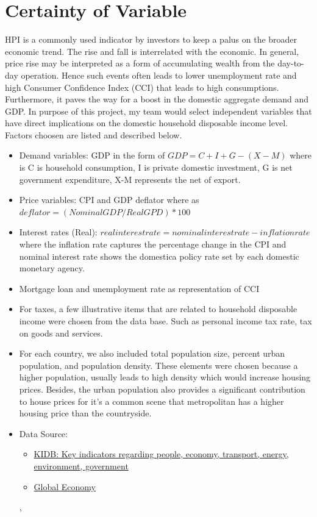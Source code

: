 \documentclass[11pt]{article}
\begin{document}
\section{Certainty of Variable}\label{section-Certainty}
HPI is a commonly used indicator by investors to keep a palus on the broader economic trend. The rise and fall is interrelated with the economic. In general, price rise may be interpreted as a form of accumulating wealth from the day-to-day operation. Hence such events often leads to lower unemployment rate and high Consumer Confidence Index (CCI) that leads to high consumptions. Furthermore, it paves the way for a boost in the domestic aggregate demand and GDP\citep{aei297454}. In purpose of this project, my team would select independent variables that have direct implications on the domestic household disposable income level. Factors choosen are listed and described below. 
\begin{itemize}
\item Demand variables: GDP in the form of \(GDP = C + I + G - (X-M)\) where is C is household consumption, I is private domestic investment, G is net government expenditure, X-M represents the net of export. 
\item Price variables: CPI and GDP deflator where as \(deflator = (Nominal GDP / Real GPD) * 100 \)
\item Interest rates (Real): \(real interest rate = nominal interest rate - inflation rate\) where the inflation rate captures the percentage change in the CPI and nominal interest rate shows the domestica policy rate set by each domestic monetary agency. 
\item Mortgage loan and unemployment rate as representation of CCI
\item For taxes, a few illustrative items that are related to household disposable income were chosen from the data base. Such as personal income tax rate, tax on goods and services.
\item For each country, we also included total population size, percent urban population, and population density. These elements were chosen because a higher population, usually leads to high density which would increase housing prices. Besides, the urban population also provides a significant contribution to house prices for it's a common scene that metropolitan has a higher housing price than the countryside.
\item Data Source: 
    \begin{itemize}
        \item \href{https://kidb.adb.org/kidb/onlineQuery}{KIDB: Key indicators regarding people, economy, transport, energy, environment, government}
        \item \href{https://www.theglobaleconomy.com/}{Global Economy}
    \end{itemize}

, 
\end{itemize}     




\end{document}
